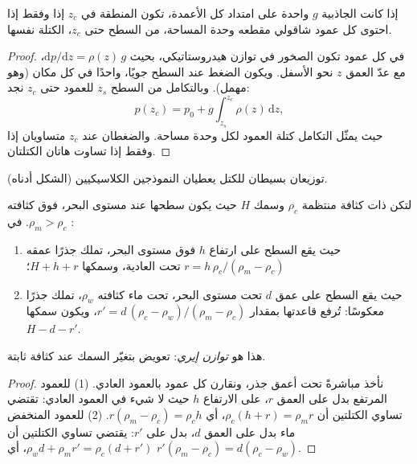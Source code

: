 \begin{proposition}\label{prop:b1:isostasy-gravity:equal-mass}
إذا كانت الجاذبية $g$ واحدة على امتداد كل الأعمدة، تكون المنطقة في   $z_c$ إذا وفقط إذا احتوى كل عمود شاقولي مقطعه وحدة المساحة، من السطح حتى $z_c$، الكتلة نفسها.
\end{proposition}

\begin{proof}
في كل عمود تكون الصخور في توازن هيدروستاتيكي، بحيث $\mathrm dp/\mathrm dz = \rho(z)\,g$، مع عدّ العمق $z$ نحو الأسفل. ويكون الضغط عند السطح جويًا، واحدًا في كل مكان (وهو مهمل). وبالتكامل من السطح $z_s$ للعمود حتى $z_c$ نجد:
\[
  p(z_c) = p_0 + g\int_{z_s}^{z_c}\rho(z)\,\mathrm dz ,
\]
حيث يمثّل التكامل كتلة العمود لكل وحدة مساحة. والضغطان عند $z_c$ متساويان إذا وفقط إذا تساوت هاتان الكتلتان.
\end{proof}

توزيعان بسيطان للكتل يعطيان النموذجين الكلاسيكيين (الشكل أدناه).

\begin{proposition}\label{prop:b1:isostasy-gravity:airy}
لتكن  ذات كثافة منتظمة $\rho_c$ وسمك $H$ حيث يكون سطحها عند مستوى البحر، فوق  كثافته $\rho_m > \rho_c$. في :
\begin{enumerate}
  \item حيث يقع السطح على ارتفاع $h$ فوق مستوى البحر، تملك  جذرًا عمقه $r = h\,\rho_c/(\rho_m - \rho_c)$ تحت  العادية، وسمكها $H + h + r$؛
  \item حيث يقع السطح على عمق $d$ تحت مستوى البحر، تحت ماء كثافته $\rho_w$، تملك  جذرًا معكوسًا: تُرفع قاعدتها بمقدار $r' = d\,(\rho_c - \rho_w)/(\rho_m - \rho_c)$، ويكون سمكها $H - d - r'$.
\end{enumerate}
هذا هو \emph{توازن إيري}: تعويض بتغيّر السمك عند كثافة ثابتة.
\end{proposition}

\begin{proof}
نأخذ  مباشرةً تحت أعمق جذر، ونقارن كل عمود بالعمود العادي. (1) للعمود المرتفع  بدل  على العمق $r$،  على الارتفاع $h$ حيث لا شيء في العمود العادي: تقتضي تساوي الكتلتين أن $\rho_c(h + r) = \rho_m r$، أي $r(\rho_m - \rho_c) = \rho_c h$. (2) للعمود المنخفض ماء بدل  على العمق $d$،  بدل  على $r'$: يقتضي تساوي الكتلتين أن $\rho_w d + \rho_m r' = \rho_c(d + r')$، أي $r'(\rho_m - \rho_c) =
d(\rho_c - \rho_w)$.
\end{proof}


